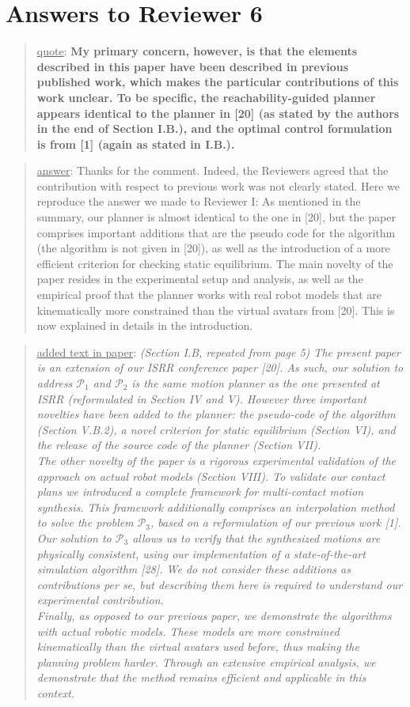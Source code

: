 \documentclass[a4paper]{article}
\newcommand{\done}[0]{}
\newcommand\quot[1]{\begin{quote} \underline{quote}: \textbf{#1}\end{quote}}
\newcommand\as[1]{\begin{quote} \underline{answer}: {#1}\end{quote} }
\newcommand\qt[1]{\begin{quote} \underline{added text in paper}: \textit{#1}\end{quote} \leavevmode \\ }
\begin{document}
\section{Answers to Reviewer 6}
\quot{ My primary concern, however,
is that the elements described in this paper have been described in
previous published work, which makes the particular contributions of
this work unclear. To be specific, the reachability-guided planner
appears identical to the planner in [20] (as stated by the authors in
the end of Section I.B.), and the optimal control formulation is from [1]
(again as stated in I.B.).}
\as{Thanks for the comment. Indeed, the Reviewers agreed that the contribution with respect to previous work was not clearly stated. Here we reproduce the answer we made to Reviewer I: As mentioned in the summary, our planner is almost identical to the one in [20], but the paper comprises important additions that are the pseudo code for the algorithm (the algorithm is not given in [20]), as well as the introduction of a more efficient criterion
for checking static equilibrium.  The main novelty of the paper resides in the experimental setup and analysis, as well as the empirical proof that the planner works with real robot models that are kinematically more constrained than the virtual avatars from [20]. This is now explained in details in the introduction.}
\qt{(Section I.B, repeated from page 5) 
The present paper is an extension of our ISRR conference paper [20]. 
As such, our solution to address $\mathcal{P}_1$ and $\mathcal{P}_2$ is the same motion planner as the one presented at ISRR (reformulated in Section IV and V). 
However three important novelties have been added to the planner: the pseudo-code of the algorithm (Section V.B.2), a novel criterion for
static equilibrium (Section VI), and the release of the source code of the planner (Section VII). \\
The other novelty of the paper is a rigorous experimental validation of the approach on actual robot models (Section VIII).
To validate our contact plans we introduced a complete framework for multi-contact motion synthesis. This framework additionally comprises an interpolation method to solve the problem $\mathcal{P}_3$,  based on a reformulation of our previous work [1]. Our solution to $\mathcal{P}_3$ allows us to verify that the synthesized motions are physically consistent, using our implementation of a state-of-the-art simulation algorithm [28]. 
We do not consider these additions as contributions \textit{per se}, but describing them here is required to understand our experimental contribution. \\
Finally, as opposed to our previous paper, we demonstrate the algorithms with actual robotic models. These models are more constrained kinematically than the virtual avatars used before,
thus making the planning problem harder. Through an extensive empirical analysis, we demonstrate that the method remains efficient and applicable in this context.}\done
\end{document}
